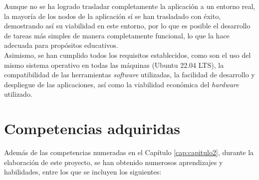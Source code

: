 Aunque no se ha logrado trasladar completamente la aplicación a un entorno real,
la mayoría de los nodos de la aplicación sí se han trasladado con éxito,
demostrando así su viabilidad en este entorno, por lo que es posible el
desarrollo de tareas más simples de manera completamente funcional, lo que la
hace adecuada para propósitos educativos.
\\

Asimismo, se han cumplido todos los requisitos establecidos, como son el uso del
mismo sistema operativo en todas las máquinas (Ubuntu 22.04 LTS), la
compatibilidad de las herramientas \textit{software} utilizadas, la facilidad de
desarrollo y despliegue de las aplicaciones, así como la viabilidad económica
del \textit{hardware} utilizado.
\\



\section{Competencias adquiridas}
\label{sec:competencias_adquiridas}

Además de las competencias numeradas en el Capítulo \ref{cap:capitulo2}, durante
la elaboración de este proyecto, se han obtenido numerosos aprendizajes y
habilidades, entre los que se incluyen los siguientes:

